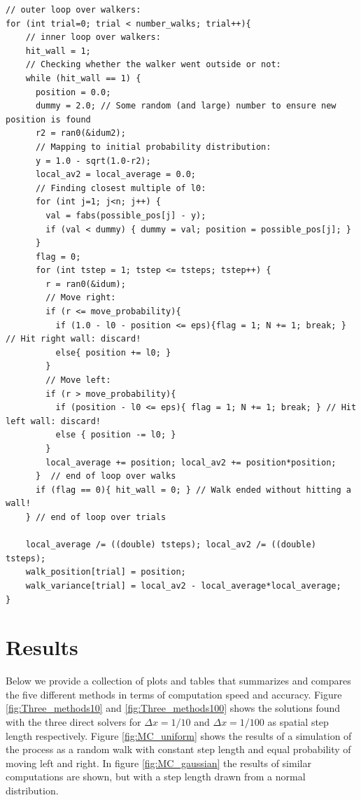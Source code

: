 \documentclass[a4paper, 11pt, notitlepage,english]{article}
\begin{document}
\begin{center}
\begin{lstlisting}
// outer loop over walkers:
for (int trial=0; trial < number_walks; trial++){
    // inner loop over walkers:
    hit_wall = 1;
    // Checking whether the walker went outside or not:
    while (hit_wall == 1) {
      position = 0.0;
      dummy = 2.0; // Some random (and large) number to ensure new position is found
      r2 = ran0(&idum2);
      // Mapping to initial probability distribution:
      y = 1.0 - sqrt(1.0-r2);
      local_av2 = local_average = 0.0;
      // Finding closest multiple of l0:
      for (int j=1; j<n; j++) {
        val = fabs(possible_pos[j] - y);
        if (val < dummy) { dummy = val; position = possible_pos[j]; }
      }
      flag = 0;
      for (int tstep = 1; tstep <= tsteps; tstep++) {
        r = ran0(&idum);
        // Move right:
        if (r <= move_probability){
          if (1.0 - l0 - position <= eps){flag = 1; N += 1; break; } // Hit right wall: discard!
          else{ position += l0; }
        }
        // Move left:
        if (r > move_probability){
          if (position - l0 <= eps){ flag = 1; N += 1; break; } // Hit left wall: discard!
          else { position -= l0; }
        }
        local_average += position; local_av2 += position*position;
      }  // end of loop over walks
      if (flag == 0){ hit_wall = 0; } // Walk ended without hitting a wall!
    } // end of loop over trials

    local_average /= ((double) tsteps); local_av2 /= ((double) tsteps);
    walk_position[trial] = position;
    walk_variance[trial] = local_av2 - local_average*local_average;
}
\end{lstlisting}
\end{center}

\section{Results}
Below we provide a collection of plots and tables that summarizes and compares the five different methods in terms of computation speed and accuracy. Figure \ref{fig:Three_methods10} and \ref{fig:Three_methods100} shows the solutions found with the three direct solvers for $\Delta x = 1/10$ and $\Delta x = 1/100$ as spatial step length respectively. Figure \ref{fig:MC_uniform} shows the results of a simulation of the process as a random walk with constant step length and equal probability of moving left and right. In figure \ref{fig:MC_gaussian} the results of similar computations are shown, but with a step length drawn from a normal distribution.
\end{document}
